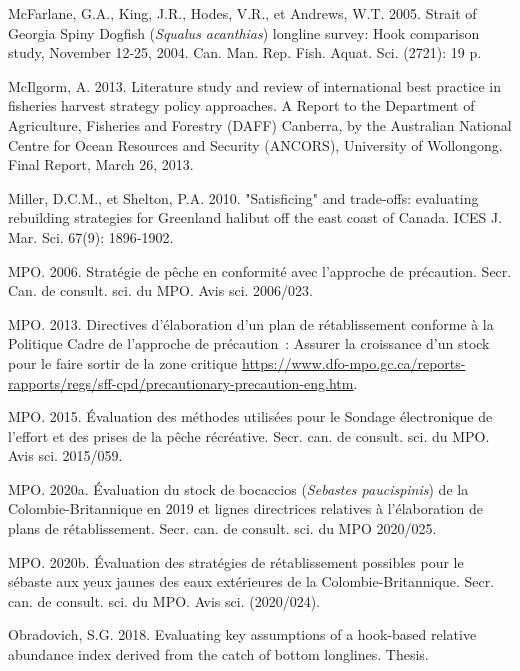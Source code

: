 \documentclass[french,11pt]{book}
\begin{document}
\leavevmode\hypertarget{ref-mcfarlane2005}{}%
McFarlane, G.A., King, J.R., Hodes, V.R., et Andrews, W.T. 2005. Strait of Georgia Spiny Dogfish (\emph{Squalus acanthias}) longline survey: Hook comparison study, November 12-25, 2004. Can. Man. Rep. Fish. Aquat. Sci. (2721): 19 p.

\leavevmode\hypertarget{ref-mcilgorm2013}{}%
McIlgorm, A. 2013. Literature study and review of international best practice in fisheries harvest strategy policy approaches. A Report to the Department of Agriculture, Fisheries and Forestry (DAFF) Canberra, by the Australian National Centre for Ocean Resources and Security (ANCORS), University of Wollongong. Final Report, March 26, 2013.

\leavevmode\hypertarget{ref-miller2010}{}%
Miller, D.C.M., et Shelton, P.A. 2010. "Satisficing" and trade-offs: evaluating rebuilding strategies for Greenland halibut off the east coast of Canada. ICES J. Mar. Sci. 67(9): 1896‑1902.

\leavevmode\hypertarget{ref-dfo2006}{}%
MPO. 2006. Stratégie de pêche en conformité avec l'approche de précaution. Secr. Can. de consult. sci. du MPO. Avis sci. 2006/023.

\leavevmode\hypertarget{ref-dfo2013}{}%
MPO. 2013. Directives d'élaboration d'un plan de rétablissement conforme à la Politique Cadre de l'approche de précaution~: Assurer la croissance d'un stock pour le faire sortir de la zone critique \url{https://www.dfo-mpo.gc.ca/reports-rapports/regs/sff-cpd/precautionary-precaution-eng.htm}.

\leavevmode\hypertarget{ref-dfo2015}{}%
MPO. 2015. Évaluation des méthodes utilisées pour le Sondage électronique de l'effort et des prises de la pêche récréative. Secr. can. de consult. sci. du MPO. Avis sci. 2015/059.

\leavevmode\hypertarget{ref-haigh2020}{}%
MPO. 2020a. Évaluation du stock de bocaccios (\emph{Sebastes paucispinis}) de la Colombie-Britannique en 2019 et lignes directrices relatives à l'élaboration de plans de rétablissement. Secr. can. de consult. sci. du MPO 2020/025.

\leavevmode\hypertarget{ref-dfo2020}{}%
MPO. 2020b. Évaluation des stratégies de rétablissement possibles pour le sébaste aux yeux jaunes des eaux extérieures de la Colombie-Britannique. Secr. can. de consult. sci. du MPO. Avis sci. (2020/024).

\leavevmode\hypertarget{ref-obradovich2018}{}%
Obradovich, S.G. 2018. Evaluating key assumptions of a hook-based relative abundance index derived from the catch of bottom longlines. Thesis.
\end{document}
